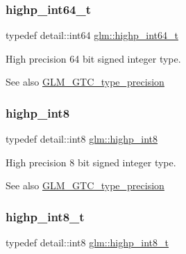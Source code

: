 \subsubsection{\texorpdfstring{highp\+\_\+int64\+\_\+t}{highp\_int64\_t}}
{\footnotesize\ttfamily typedef detail\+::int64 \hyperlink{group__gtc__type__precision_ga0f5186bde44471133b08057cae8a51ac}{glm\+::highp\+\_\+int64\+\_\+t}}

High precision 64 bit signed integer type. \begin{DoxySeeAlso}{See also}
\hyperlink{group__gtc__type__precision}{G\+L\+M\+\_\+\+G\+T\+C\+\_\+type\+\_\+precision} 
\end{DoxySeeAlso}
\mbox{\label{group__gtc__type__precision_ga57c86999e666760c304453f9bfdc09d1}} 
\subsubsection{\texorpdfstring{highp\+\_\+int8}{highp\_int8}}
{\footnotesize\ttfamily typedef detail\+::int8 \hyperlink{group__gtc__type__precision_ga57c86999e666760c304453f9bfdc09d1}{glm\+::highp\+\_\+int8}}

High precision 8 bit signed integer type. \begin{DoxySeeAlso}{See also}
\hyperlink{group__gtc__type__precision}{G\+L\+M\+\_\+\+G\+T\+C\+\_\+type\+\_\+precision} 
\end{DoxySeeAlso}
\mbox{\label{group__gtc__type__precision_ga417701b99e6e7992f35ab2ef694f88b2}} 
\subsubsection{\texorpdfstring{highp\+\_\+int8\+\_\+t}{highp\_int8\_t}}
{\footnotesize\ttfamily typedef detail\+::int8 \hyperlink{group__gtc__type__precision_ga417701b99e6e7992f35ab2ef694f88b2}{glm\+::highp\+\_\+int8\+\_\+t}}

